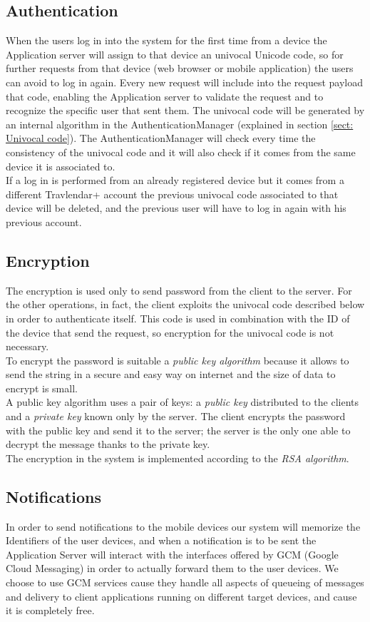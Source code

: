 \subsection{Authentication}
\label{subsect:Authentication}
When the users log in into the system for the first time from a device the Application server will assign to that device an univocal Unicode code, so for further requests from that device (web browser or mobile application) the users can avoid to log in again. Every new request will include into the request payload that code, enabling the Application server to validate the request and to recognize the specific user that sent them. The univocal code will be generated by an internal algorithm in the AuthenticationManager (explained in section \ref{sect: Univocal code}). The AuthenticationManager will check every time the consistency of the univocal code and it will also check if it comes from the same device it is associated to.\\
If a log in is performed from an already registered device but it comes from a different Travlendar+ account the previous univocal code associated to that device will be deleted, and the previous user will have to log in again with his previous account.

\subsection{Encryption}
\label{subsect:Encryption}
The encryption is used only to send password from the client to the server. For the other operations, in fact, the client exploits the univocal code described below in order to authenticate itself. This code is used in combination with the ID of the device that send the request, so encryption for the univocal code is not necessary.\\
To encrypt the password is suitable a \textit{public key algorithm} because it allows to send the string in a secure and easy way on internet and the size of data to encrypt is small.\\
A public key algorithm uses a pair of keys: a \textit{public key} distributed to the clients and a \textit{private key} known only by the server. The client encrypts the password with the public key and send it to the server; the server is the only one able to decrypt the message thanks to the private key.\\
The encryption in the system is implemented according to the \textit{RSA algorithm}.

\subsection{Notifications}
\label{subsect: Notifications}
In order to send notifications to the mobile devices our system will memorize the Identifiers of the user devices, and when a notification is to be sent the Application Server will interact with the interfaces offered by GCM (Google Cloud Messaging) in order to actually forward them to the user devices. We choose to use GCM services cause they handle all aspects of queueing of messages and delivery to client applications running on different target devices, and cause it is completely free.

